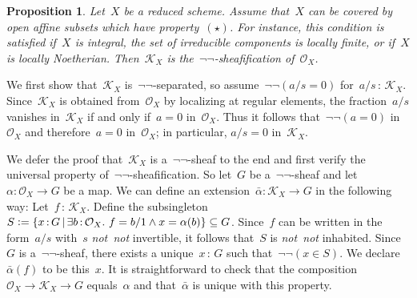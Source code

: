 \documentclass[10pt,reqno,a4paper]{amsbook}
\makeatletter
\theoremstyle{definition}
\theoremstyle{plain}
\newtheorem{prop}[defn]{Proposition}
\theoremstyle{remark}
\renewcommand{\O}{\mathcal{O}}
\newcommand{\K}{\mathcal{K}}
\newcommand{\?}{\,{:}\,}
\renewcommand{\_}{\mathpunct{.}\,}
\newcommand{\notnot}{\emph{not~not}\xspace}
\newcommand{\defeq}{\vcentcolon=}
\renewenvironment{proof}[1][\proofname]{\par
  \pushQED{\qed}%
  \normalfont \topsep6\p@\@plus6\p@\relax
  \trivlist
  \item[\hskip\labelsep
        \itshape
    #1\@addpunct{.}]\ignorespaces
}{%
  \popQED\endtrivlist\@endpefalse
}
\makeatother
\begin{document}
\begin{prop}
\label{prop:kx-is-negneg-sheafification}
Let~$X$ be a reduced scheme. Assume that~$X$ can be covered by open affine
subsets which have property~$(\star)$. For instance, this condition is satisfied
if~$X$ is integral, the set of irreducible components is locally finite, or if~$X$ is locally Noetherian. Then~$\K_X$ is
the~$\neg\neg$-sheafification of~$\O_X$.\end{prop}
\begin{proof}
We first show that~$\K_X$ is~$\neg\neg$-separated,
so assume~$\neg\neg(a/s = 0)$ for~$a/s \? \K_X$. Since~$\K_X$ is obtained
from~$\O_X$ by localizing at regular elements, the fraction~$a/s$ vanishes
in~$\K_X$ if and only if~$a = 0$ in~$\O_X$. Thus it follows that~$\neg\neg(a =
0)$ in~$\O_X$ and therefore~$a = 0$ in~$\O_X$; in particular, $a/s = 0$ in~$\K_X$.

We defer the proof that~$\K_X$ is a~$\neg\neg$-sheaf to the end and first
verify the universal property of~$\neg\neg$-sheafification.
So let~$G$ be a~$\neg\neg$-sheaf and let~$\alpha : \O_X \to G$ be a map. We
can define an extension~$\bar\alpha : \K_X \to G$ in the following way:
Let~$f \? \K_X$. Define the subsingleton~$S \defeq \{ x \? G \,|\, \exists
b\?\O_X\_ f = b/1 \wedge x = \alpha(b) \} \subseteq G$. Since~$f$ can be
written in the form~$a/s$ with~$s$ \notnot invertible, it follows that~$S$
is \notnot inhabited. Since~$G$ is a~$\neg\neg$-sheaf, there exists a
unique~$x\?G$ such that~$\neg\neg(x \in S)$. We declare~$\bar\alpha(f)$ to be
this~$x$. It is straightforward to check that the composition~$\O_X \to \K_X
\to G$ equals~$\alpha$ and that~$\bar\alpha$ is unique with this property.


\end{proof}
\end{document}
